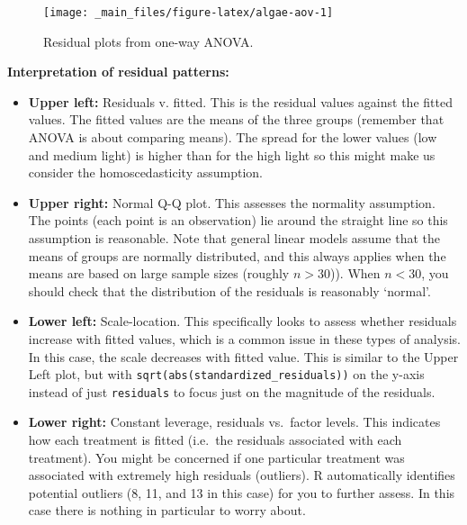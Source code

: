 \documentclass[
  11pt,
  a4paper,
]{book}
\providecommand{\tightlist}{%
  \setlength{\itemsep}{0pt}\setlength{\parskip}{0pt}}
\begin{document}
\begin{figure}

{\centering \texttt{[image: \_main\_files/figure-latex/algae-aov-1]} 

}

\caption{Residual plots from one-way ANOVA.}\label{fig:algae-aov}
\end{figure}

\textbf{Interpretation of residual patterns:}

\begin{itemize}
\tightlist
\item
  \textbf{Upper left:} Residuals v. fitted. This is the residual values against the fitted values. The fitted values are the means of the three groups (remember that ANOVA is about comparing means). The spread for the lower values (low and medium light) is higher than for the high light so this might make us consider the homoscedasticity assumption.\\
\item
  \textbf{Upper right:} Normal Q-Q plot. This assesses the normality assumption. The points (each point is an observation) lie around the straight line so this assumption is reasonable. Note that general linear models assume that the means of groups are normally distributed, and this always applies when the means are based on large sample sizes (roughly \(n > 30\))). When \(n < 30\), you should check that the distribution of the residuals is reasonably `normal'.\\
\item
  \textbf{Lower left:} Scale-location. This specifically looks to assess whether residuals increase with fitted values, which is a common issue in these types of analysis. In this case, the scale decreases with fitted value. This is similar to the Upper Left plot, but with \texttt{sqrt(abs(standardized\_residuals))} on the y-axis instead of just \texttt{residuals} to focus just on the magnitude of the residuals.\\
\item
  \textbf{Lower right:} Constant leverage, residuals vs.~factor levels. This indicates how each treatment is fitted (i.e.~the residuals associated with each treatment). You might be concerned if one particular treatment was associated with extremely high residuals (outliers). R automatically identifies potential outliers (8, 11, and 13 in this case) for you to further assess. In this case there is nothing in particular to worry about.
\end{itemize}
\end{document}
